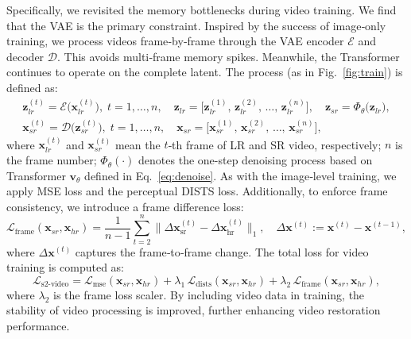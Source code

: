 \documentclass{article}
\begin{document}
Specifically, we revisited the memory bottlenecks during video training. We find that the VAE is the primary constraint. Inspired by the success of image‑only training, we process videos frame‑by‑frame through the VAE encoder $\mathcal{E}$ and decoder $\mathcal{D}$. This avoids multi‑frame memory spikes. Meanwhile, the Transformer continues to operate on the complete latent. The process (as in Fig.~\ref{fig:train}) is defined as:
\begin{equation}
\begin{gathered}
\mathbf{z}_{lr}^{(t)} = \mathcal{E}\!\bigl(\mathbf{x}_{lr}^{(t)}\bigr), \; t = 1,\dots,n, \quad
\mathbf{z}_{lr} = \bigl[\mathbf{z}_{lr}^{(1)},\,\mathbf{z}_{lr}^{(2)},\,\dots,\,\mathbf{z}_{lr}^{(n)}\bigr], \quad
\mathbf{z}_{sr} = \Phi_{\theta}\!\bigl(\mathbf{z}_{lr}\bigr), \\
\mathbf{x}_{sr}^{(t)} = \mathcal{D}\!\bigl(\mathbf{z}_{sr}^{(t)}\bigr), \; t = 1,\dots,n, \quad
\mathbf{x}_{sr} = \bigl[\mathbf{x}_{sr}^{(1)},\,\mathbf{x}_{sr}^{(2)},\,\dots,\,\mathbf{x}_{sr}^{(n)}\bigr],
\end{gathered}
\end{equation}
where $\mathbf{x}_{lr}^{(t)}$ and $\mathbf{x}_{sr}^{(t)}$ mean the $t$‑th frame of LR and SR video, respectively; $n$ is the frame number; $\Phi_{\theta}(\cdot)$ denotes the one-step denoising process based on Transformer $\mathbf{v}_{\theta}$ defined in Eq.~\eqref{eq:denoise}. As with the image‑level training, we apply MSE loss and the perceptual DISTS loss. Additionally, to enforce frame consistency, we introduce a frame difference loss:
\begin{equation}
\mathcal{L}_{\text{frame}}(\mathbf{x}_{sr}, \mathbf{x}_{hr})
= \frac{1}{n-1}\sum_{t=2}^{n}
\bigl\|
\Delta\mathbf{x}_{\text{sr}}^{(t)}
-
\Delta\mathbf{x}_{\text{hr}}^{(t)}
\bigr\|_{1},
\quad
\Delta\mathbf{x}^{(t)} := \mathbf{x}^{(t)} - \mathbf{x}^{(t-1)},
\end{equation}
where $\Delta\mathbf{x}^{(t)}$ captures the frame‑to‑frame change. The total loss for video training is computed as:
\begin{equation}
\mathcal{L}_{\text{s2-video}} = \mathcal{L}_{\text{mse}}(\mathbf{x}_{sr}, \mathbf{x}_{hr}) + \lambda_1 \, \mathcal{L}_{\text{dists}}(\mathbf{x}_{sr}, \mathbf{x}_{hr}) + \lambda_2 \, \mathcal{L}_{\text{frame}}(\mathbf{x}_{sr}, \mathbf{x}_{hr}) ,
\end{equation}
where $\lambda_2$ is the frame loss scaler. By including video data in training, the stability of video processing is improved, further enhancing video restoration performance. 
\end{document}
